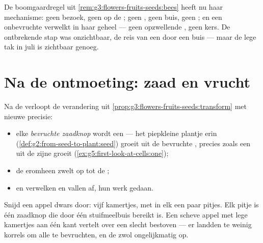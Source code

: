 \begin{example}\label{ex:g5:flower-to-fruit:unvisited}
De boomgaardregel uit \cref{rem:g3:flowers-fruits-seeds:bees} heeft nu
haar mechanisme: geen bezoek, geen  op de ; geen
, geen buis, geen ; en een onbevruchte 
verwelkt in haar geheel --- geen opzwellende , geen kers. De
ontbrekende stap was onzichtbaar, de reis van een  door een buis ---
maar de lege tak in juli is zichtbaar genoeg.
\end{example}

\section{Na de ontmoeting: zaad en vrucht}

\begin{proposition}\label{prop:g5:flower-to-fruit:becomes}
Na de  verloopt de verandering uit
\cref{prop:g3:flowers-fruits-seeds:transform} met nieuwe precisie:
\begin{itemize}
  \item elke \emph{bevruchte zaadknop} wordt een \emph{} --- het
        piepkleine plantje erin
        (\cref{def:g2:from-seed-to-plant:seed}) groeit uit de bevruchte
        , precies zoals een  uit de zijne groeit
        (\cref{ex:g5:first-look-at-cells:one});
  \item de \emph{} eromheen zwelt op tot de \emph{};
  \item {} en  verwelken en vallen af, hun werk
        gedaan.
\end{itemize}
\end{proposition}
\admitted

\begin{example}\label{ex:g5:flower-to-fruit:pips}
Snijd een appel dwars door: vijf kamertjes, met in elk een paar pitjes.
Elk pitje is één zaadknop die door één stuifmeelbuis bereikt is. Een
scheve appel met lege kamertjes aan één kant vertelt over een slecht
bestoven  --- er landden te weinig korrels om alle  te
bevruchten, en de  zwol ongelijkmatig op.
\end{example}

